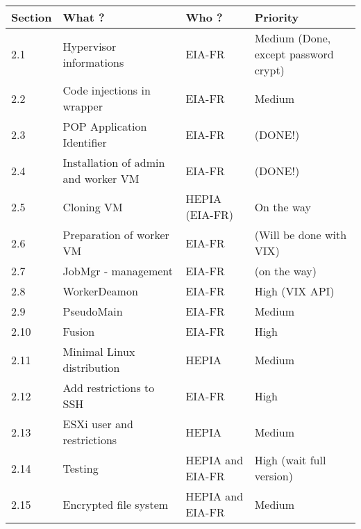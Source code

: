 \begin{center}
\begin{tabular}{|p{1.5cm}|p{7.5cm}|p{2cm}|p{4cm}|}
\hline
\textbf{Section} & \textbf{What ?}	& \textbf{Who ?} & \textbf{Priority} \\ \hline
2.1 & Hypervisor informations & EIA-FR & Medium (Done, except password crypt) \\ \hline

2.2 & Code injections in wrapper & EIA-FR & Medium \\ \hline

2.3 & POP Application Identifier & EIA-FR & (DONE!)\\ \hline

2.4 & Installation of admin and worker VM & EIA-FR & (DONE!) \\ \hline

2.5 & Cloning VM & HEPIA (EIA-FR) & On the way \\ \hline

2.6 & Preparation of worker VM & EIA-FR & (Will be done with VIX) \\ \hline

2.7 & JobMgr - management & EIA-FR & (on the way) \\ \hline

2.8 & WorkerDeamon & EIA-FR & High (VIX API)\\ \hline

2.9 & PseudoMain & EIA-FR & Medium \\ \hline

2.10 & Fusion & EIA-FR & High\\ \hline

2.11 & Minimal Linux distribution & HEPIA & Medium \\ \hline

2.12 & Add restrictions to SSH & EIA-FR & High \\ \hline

2.13 & ESXi user and restrictions & HEPIA & Medium \\ \hline

2.14 & Testing & HEPIA and EIA-FR & High (wait full version) \\ \hline

2.15 & Encrypted file system & HEPIA and EIA-FR & Medium \\ \hline

\end{tabular}
\end{center}\s
